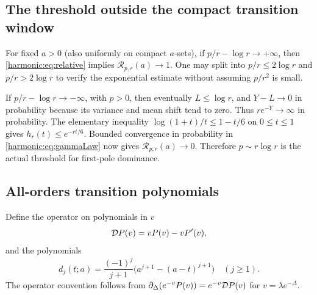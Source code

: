 \subsection{The threshold outside the compact transition window}
For fixed $a>0$ (also uniformly on compact $a$-sets), if
$p/r-\log r\to+\infty$, then \eqref{harmonic:eq:relative} implies
$\mathcal R_{p,r}(a)\to1$. One may split into $p/r\le2\log r$ and $p/r>2\log r$ to verify the exponential estimate without assuming $p/r^2$ is small.

If $p/r-\log r\to-\infty$, with $p>0$, then eventually $L\le\log r$, and $Y-L\to0$ in probability because its variance and mean shift tend to zero. Thus $re^{-Y}\to\infty$ in probability. The elementary inequality
$\log(1+t)/t\le1-t/6$ on $0\le t\le1$ gives
$h_r(t)\le e^{-rt/6}$. Bounded convergence in probability in \eqref{harmonic:eq:gammaLaw} now gives $\mathcal R_{p,r}(a)\to0$. Therefore $p\sim r\log r$ is the actual threshold for first-pole dominance.

\subsection{All-orders transition polynomials}
\label{harmonic:sec:allorders}
Define the operator on polynomials in $v$
\begin{equation}\label{harmonic:eq:Dop}
 \mathcal D P(v)=vP(v)-vP'(v),
\end{equation}
and the polynomials
\begin{equation}\label{harmonic:eq:dj}
 d_j(t;a)=\frac{(-1)^j}{j+1}
              \bigl(a^{j+1}-(a-t)^{j+1}\bigr)\quad(j\ge1).
\end{equation}
The operator convention follows from
$\partial_\Delta(e^{-v}P(v))=e^{-v}\mathcal D P(v)$ for $v=\lambda e^{-\Delta}$.

